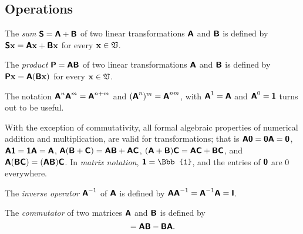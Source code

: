 \subsection{Operations}
The {\em sum}
$\textsf{\textbf{S}} =\textsf{\textbf{A}} +\textsf{\textbf{B}} $
of two linear transformations $\textsf{\textbf{A}}$ and $\textsf{\textbf{B}} $
is defined by
$\textsf{\textbf{S}} {\bf x}=\textsf{\textbf{A}}{\bf x} +\textsf{\textbf{B}} {\bf x}$
for every ${\bf x}\in {\frak V}$.

The {\em product}
$\textsf{\textbf{P}} =\textsf{\textbf{A}} \textsf{\textbf{B}} $
of two linear transformations $\textsf{\textbf{A}}$ and $\textsf{\textbf{B}} $
is defined by
$\textsf{\textbf{P}} {\bf x}=\textsf{\textbf{A}}(\textsf{\textbf{B}} {\bf x})$
for every ${\bf x}\in {\frak V}$.

The notation
$\textsf{\textbf{A}}^n\textsf{\textbf{A}}^m=\textsf{\textbf{A}}^{n+m}$
and $(\textsf{\textbf{A}}^n)^m= \textsf{\textbf{A}}^{nm}$,
with $\textsf{\textbf{A}}^1=\textsf{\textbf{A}}$ and
$\textsf{\textbf{A}}^0 =\textsf{\textbf{1}}$ turns out to be useful.

With the exception of commutativity, all formal algebraic properties
of numerical addition and multiplication,
are valid for transformations; that is
$
\textsf{\textbf{A}}\textsf{\textbf{0}}=
\textsf{\textbf{0}}\textsf{\textbf{A}} =\textsf{\textbf{0}}
$,
$
\textsf{\textbf{A}}\textsf{\textbf{1}}=
\textsf{\textbf{1}}\textsf{\textbf{A}} =\textsf{\textbf{A}}
$,
$
\textsf{\textbf{A}} (\textsf{\textbf{B}}+\textsf{\textbf{C}})=
\textsf{\textbf{A}} \textsf{\textbf{B}}
+
\textsf{\textbf{A}} \textsf{\textbf{C}}
$,
$
(\textsf{\textbf{A}}+ \textsf{\textbf{B}})\textsf{\textbf{C}}=
\textsf{\textbf{A}} \textsf{\textbf{C}}
+
\textsf{\textbf{B}} \textsf{\textbf{C}}
$,  and
$
\textsf{\textbf{A}} (\textsf{\textbf{B}}\textsf{\textbf{C}})=
(\textsf{\textbf{A}} \textsf{\textbf{B}})
 \textsf{\textbf{C}}
$.
In {\em matrix notation},  $\textsf{\textbf{1}} ={\Bbb{1}}$, and the entries of $\textsf{\textbf{0}}$
are $0$ everywhere.

The {\em inverse operator}
$\textsf{\textbf{A}}^{-1}$
of $\textsf{\textbf{A}}$
is defined by
$\textsf{\textbf{A}}\textsf{\textbf{A}}^{-1}=\textsf{\textbf{A}}^{-1}\textsf{\textbf{A}}=
\textsf{\textbf{I}}$.


The {\em commutator}
of two matrices $\textsf{\textbf{A}}$  and $\textsf{\textbf{B}}$ is defined by
\begin{equation}
[\textsf{\textbf{A}}, \textsf{\textbf{B}} ]
=
\textsf{\textbf{A}} \textsf{\textbf{B}}
-
 \textsf{\textbf{B}}      \textsf{\textbf{A}}.
\end{equation}

